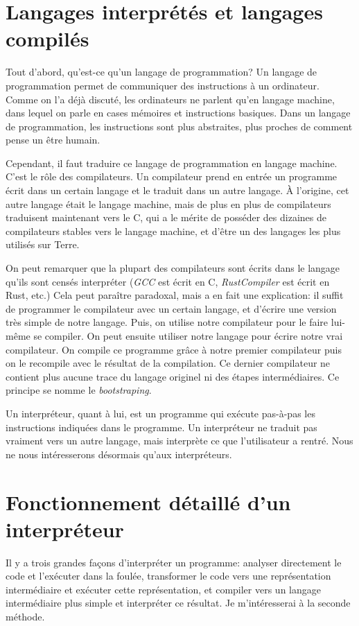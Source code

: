 \documentclass{article}
\begin{document}
\section{Langages interprétés et langages compilés}
Tout d’abord, qu’est-ce qu’un langage de programmation\nobreakspace?
Un langage de programmation permet de communiquer des instructions à un ordinateur.
Comme on l’a déjà discuté, les ordinateurs ne parlent qu’en langage machine, dans lequel
on parle en cases mémoires et instructions basiques. Dans un langage de programmation,
les instructions sont plus abstraites, plus proches de comment pense un être humain. \cite[p. 55]{berry}

Cependant, il faut traduire ce langage de programmation en langage machine. C’est le rôle
des compilateurs. Un compilateur prend en entrée un programme écrit dans un certain langage
et le traduit dans un autre langage. \cite{github-programming-languages}
À l’origine, cet autre langage était le langage machine,
mais de plus en plus de compilateurs traduisent maintenant vers le C, qui a le mérite de posséder
des dizaines de compilateurs stables vers le langage machine, et d’être un des langages les
plus utilisés sur Terre.

On peut remarquer que la plupart des compilateurs sont écrits dans le
langage qu’ils sont censés interpréter (\textit{GCC} est écrit en C, \textit{RustCompiler}
est écrit en Rust, etc.)
Cela peut paraître paradoxal, mais a en fait une explication\nobreakspace: il suffit de programmer
le compilateur avec un certain langage, et d’écrire une version très simple de notre langage.
Puis, on utilise notre compilateur pour le faire lui-même se compiler. On peut ensuite utiliser notre
langage pour écrire notre vrai compilateur. On compile ce programme grâce à notre premier compilateur
puis on le recompile avec le résultat de la compilation. Ce dernier compilateur ne contient plus
aucune trace du langage originel ni des étapes intermédiaires. Ce principe se nomme le
\textit{bootstraping}. \cite[p. 448]{berry}

Un interpréteur, quant à lui, est un programme qui exécute pas-à-pas les instructions indiquées
dans le programme. Un interpréteur ne traduit pas vraiment vers un autre langage, mais interprète
ce que l’utilisateur a rentré. \cite{github-programming-languages}
Nous ne nous intéresserons désormais qu’aux interpréteurs.

\section{Fonctionnement détaillé d’un interpréteur}
Il y a trois grandes façons d’interpréter un programme\nobreakspace: analyser directement le code
et l’exécuter dans la foulée, transformer le code vers une représentation intermédiaire et exécuter
cette représentation, et compiler vers un langage intermédiaire plus simple et interpréter ce
résultat. \cite{wikipedia-interpreter} Je m’intéresserai à la seconde méthode.
\end{document}
